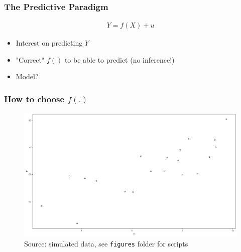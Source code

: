 \documentclass[
  shownotes,
  xcolor={svgnames},
  hyperref={colorlinks,citecolor=DarkBlue,linkcolor=DarkRed,urlcolor=DarkBlue}
  , aspectratio=169]{beamer}
\begin{document}

\begin{frame}
\frametitle{The Predictive Paradigm}


\begin{align}
Y=f(X)+u
\end{align}

\begin{itemize}
  \item Interest on predicting $Y$
  \medskip
  \item "Correct" $f()$ to be able to predict (no inference!)
  \medskip
  \item Model?

\end{itemize}


\end{frame}



\begin{frame}
\frametitle{How to choose $f(.)$}




\begin{figure}[H] \centering
  \centering
  \includegraphics[scale=0.25]{figures/fig_1.pdf}
  \\
  \tiny
  Source: simulated data, see \texttt{figures} folder for scripts
\end{figure}


\end{frame}

\end{document}
